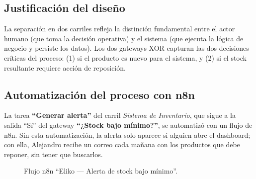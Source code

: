 \documentclass[11pt,letterpaper]{article}
\renewcommand{\_}{\oldus\allowbreak}
\begin{document}
\subsection{Justificación del diseño}
La separación en dos carriles refleja la distinción fundamental entre el actor humano (que toma la decisión operativa) y el sistema (que ejecuta la lógica de negocio y persiste los datos). Los dos gateways XOR capturan las dos decisiones críticas del proceso: (1) si el producto es nuevo para el sistema, y (2) si el stock resultante requiere acción de reposición.

\subsection{Automatización del proceso con n8n}
La tarea \textbf{“Generar alerta”} del carril \emph{Sistema de Inventario}, que sigue a la salida “Sí” del gateway \textbf{“¿Stock bajo mínimo?”}, se automatizó con un flujo de n8n. Sin esta automatización, la alerta solo aparece si alguien abre el dashboard; con ella, Alejandro recibe un correo cada mañana con los productos que debe reponer, sin tener que buscarlos.

\begin{figure}[h]
\centering
{}
\caption{Flujo n8n “Eliko — Alerta de stock bajo mínimo”.}\label{fig:n8n}
\end{figure}
\end{document}
